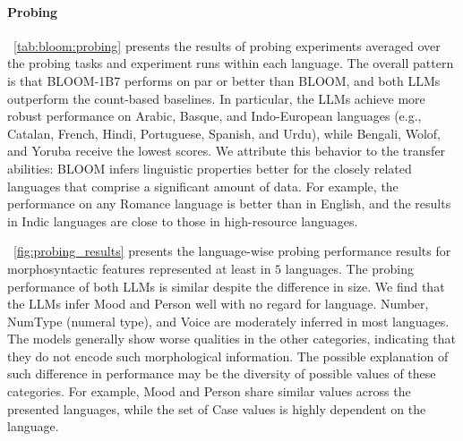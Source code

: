 \documentclass[twoside,11pt]{article}
\begin{document}
\paragraph{Probing} ~\autoref{tab:bloom:probing} presents the results of probing experiments averaged over the probing tasks and experiment runs within each language. The overall pattern is that BLOOM-1B7 performs on par or better than BLOOM, and both LLMs outperform the count-based baselines. In particular, the LLMs achieve more robust performance on Arabic, Basque, and Indo-European languages (e.g., Catalan, French, Hindi, Portuguese, Spanish, and Urdu), while Bengali, Wolof, and Yoruba receive the lowest scores. We attribute this behavior to the transfer abilities: BLOOM infers linguistic properties better for the closely related languages that comprise a significant amount of data. For example, the performance on any Romance language is better than in English, and the results in Indic languages are close to those in high-resource languages.  





~\autoref{fig:probing_results} presents the language-wise probing performance results for morphosyntactic features represented at least in $5$ languages. The probing performance of both LLMs is similar despite the difference in size. We find that the LLMs infer Mood and Person well with no regard for language. Number, NumType (numeral type), and Voice are moderately inferred in most languages. The models generally show worse qualities in the other categories, indicating that they do not encode such morphological information. The possible explanation of such difference in performance may be the diversity of possible values of these categories. For example, Mood and Person share similar values across the presented languages, while the set of Case values is highly dependent on the language.
\end{document}
